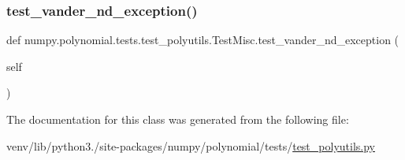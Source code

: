 \subsubsection{\texorpdfstring{test\+\_\+vander\+\_\+nd\+\_\+exception()}{test\_vander\_nd\_exception()}}
{\footnotesize\ttfamily def numpy.\+polynomial.\+tests.\+test\+\_\+polyutils.\+Test\+Misc.\+test\+\_\+vander\+\_\+nd\+\_\+exception (\begin{DoxyParamCaption}\item[{}]{self }\end{DoxyParamCaption})}



The documentation for this class was generated from the following file\+:\begin{DoxyCompactItemize}
\item 
venv/lib/python3./site-\/packages/numpy/polynomial/tests/\hyperlink{test__polyutils_8py}{test\+\_\+polyutils.\+py}\end{DoxyCompactItemize}
